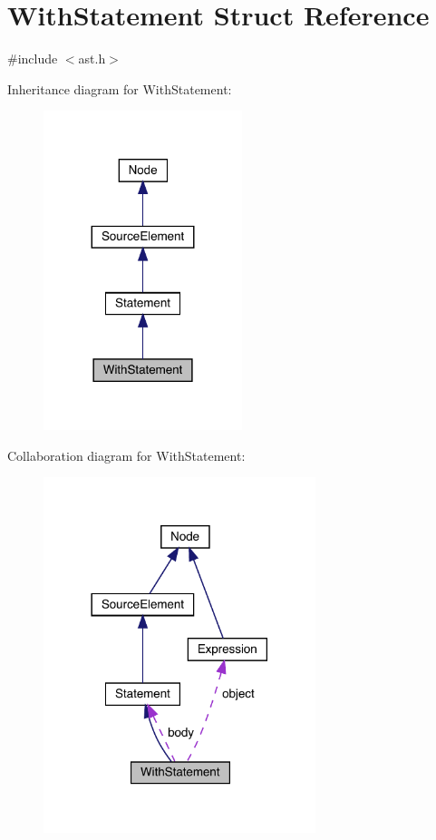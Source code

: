 \hypertarget{struct_with_statement}{}\section{With\+Statement Struct Reference}
\label{struct_with_statement}


{\ttfamily \#include $<$ast.\+h$>$}



Inheritance diagram for With\+Statement\+:
\nopagebreak
\begin{figure}[H]
\begin{center}
\leavevmode
\includegraphics[width=164pt]{struct_with_statement__inherit__graph}
\end{center}
\end{figure}


Collaboration diagram for With\+Statement\+:
\nopagebreak
\begin{figure}[H]
\begin{center}
\leavevmode
\includegraphics[width=225pt]{struct_with_statement__coll__graph}
\end{center}
\end{figure}
